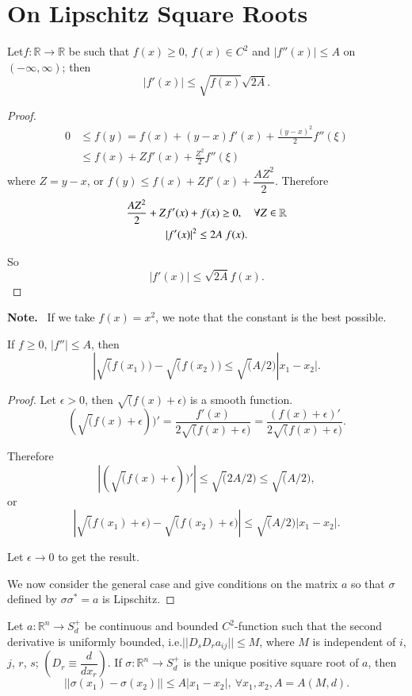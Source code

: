 \chapter{On Lipschitz Square Roots}\label{chap27}

\begin{lemma*}
Let\pageoriginale $f:\mathbb{R}\to \mathbb{R}$ be such that $f(x)\geq
0$, $f(x)\in C^{2}$ and $|f''(x)|\leq A$ on $(-\infty,\infty)$; then
$$
|f'(x)|\leq \sqrt{f(x)}\sqrt{2A}.
$$
\end{lemma*}

\begin{proof}
\begin{align*}
0 &\leq f(y)=f(x)+(y-x)f'(x)+\frac{(y-x)^{2}}{2}f''(\xi)\\
&\leq f(x)+Zf'(x)+\frac{Z^{2}}{2}f''(\xi)
\end{align*}
where $Z=y-x$, or $f(y)\leq f(x)+Zf'(x)+\dfrac{AZ^{2}}{2}$. Therefore
\begin{gather*}
\frac{AZ^{2}}{2}+Zf'(x)+f(x)\geq 0,\quad \forall Z\in \mathbb{R}\\
|f'(x)|^{2}\leq 2A\ f(x).
\end{gather*}

So 
$$
|f'(x)|\leq \sqrt{2A}f(x).
$$
\end{proof}

\noindent
{\bf Note.}~ If we take $f(x)=x^{2}$, we note that the constant is the
best possible.

\begin{coro*}
If $f\geq 0$, $|f''|\leq A$, then
$$
|\surd (f(x_{1}))-\surd (f(x_{2}))\leq \surd (A/2)|x_{1}-x_{2}|.
$$
\end{coro*}

\begin{proof}
Let $\epsilon>0$, then $\surd(f(x)+\epsilon)$ is a smooth function.
$$
(\surd(f(x)+\epsilon))'=\dfrac{f'(x)}{2\surd
  (f(x)+\epsilon)}=\frac{(f(x)+\epsilon)'}{2\surd (f(x)+\epsilon)}.
$$

Therefore
$$
|(\surd (f(x)+\epsilon))'|\leq \surd (2A/2)\leq \surd (A/2),
$$
or
$$
|\surd (f(x_{1})+\epsilon)-\surd (f(x_{2})+\epsilon)|\leq \surd
(A/2)|x_{1}-x_{2}|. 
$$\pageoriginale

Let $\epsilon\to 0$ to get the result.

We now consider the general case and give conditions on the matrix $a$
so that $\sigma$ defined by $\sigma\sigma^{*}=a$ is Lipschitz.
\end{proof}

\begin{theorem*}
Let $a:\mathbb{R}^{n}\to S^{+}_{d}$ be continuous and bounded
$C^{2}$-function such that the second derivative is uniformly bounded,
i.e.\@ $||D_{s}D_{r}a_{ij}||\leq M$, where $M$ is independent of $i$,
$j$, $r$, $s$; $(D_{r}\equiv \dfrac{d}{dx_{r}})$. If
$\sigma:\mathbb{R}^{n}\to S^{+}_{d}$ is the unique positive square
root of $a$, then
$$
||\sigma(x_{1})-\sigma(x_{2})||\leq A|x_{1}-x_{2}|,\ \forall
x_{1},x_{2},A=A(M,d). 
$$
\end{theorem*}


